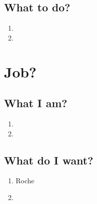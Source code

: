 \documentclass[11pt, twoside]{article}   	%
\begin{document}
\subsection{What to do?}
\begin{enumerate}
\item 
\item 
\end {enumerate}


 \bigskip
\section{Job?}
\subsection{What I am?}
\renewcommand{\labelenumii}{\alph{enumii}}
\begin{enumerate}
\item 
\item 
\end {enumerate}
\subsection{What do I want?}
\begin{enumerate}
\item Roche 
\item 
\end {enumerate}
\end{document}
